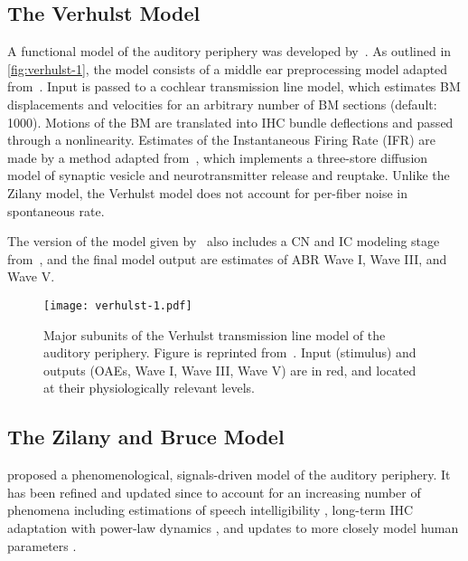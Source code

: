 \subsection{The Verhulst Model} %
\label{sub:the_verhulst_model}
A functional model of the auditory periphery was developed by~\cite{Verhulst2015Functional}.  As outlined in \autoref{fig:verhulst-1}, the model consists of a middle ear preprocessing model adapted from~\cite{Meddis2010Computational}.  Input is passed to a cochlear transmission line model, which estimates BM displacements and velocities for an arbitrary number of BM sections (default: 1000).  Motions of the BM are translated into IHC bundle deflections and passed through a nonlinearity.  Estimates of the Instantaneous Firing Rate (IFR) are made by a method adapted from~\cite{Westerman1988Diffusion}, which implements a three-store diffusion model of synaptic vesicle and neurotransmitter release and reuptake.  Unlike the Zilany model, the Verhulst model does not account for per-fiber noise in spontaneous rate.

The version of the model given by~\cite{Verhulst2015Functional} also includes a CN and IC modeling stage from~\cite{Nelson2004Phenomenological}, and the final model output are estimates of ABR Wave I, Wave III, and Wave V. 

\begin{figure}[htbp]
	\centering
	\texttt{[image: verhulst-1.pdf]}
	\caption[The Verhulst Model]{Major subunits of the Verhulst transmission line model of the auditory periphery.  Figure is reprinted from~\cite{Verhulst2015Functional}.  Input (stimulus) and outputs (OAEs, Wave I, Wave III, Wave V) are in red, and located at their physiologically relevant levels.}
	\label{fig:verhulst-1}
\end{figure}


\subsection{The Zilany and Bruce Model} %
\label{sub:the_zilany_and_bruce_model}
\cite{Zilany2006Modeling} proposed a phenomenological, signals-driven model of the auditory periphery.  It has been refined and updated since to account for an increasing number of phenomena including estimations of speech intelligibility \citep{Zilany2007Predictions}, long-term IHC adaptation with power-law dynamics \citep{Zilany2009Phenomenological}, and updates to more closely model human parameters \citep{Zilany2014Updated}.  


